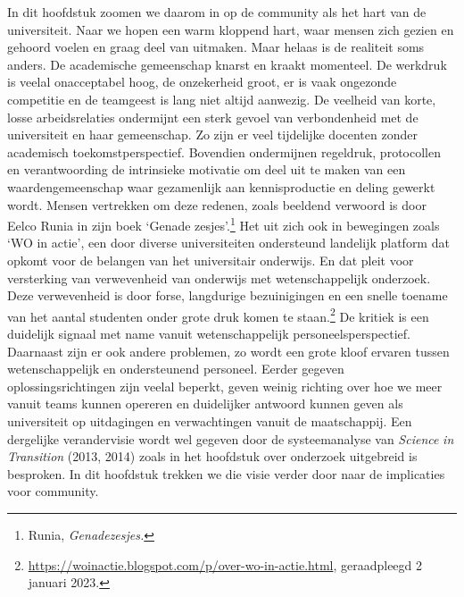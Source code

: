 \documentclass[smallauthor, chapterhaspagenum, nochapterinheader, pagenuminheader,  bigchapnum,medium2, tocpages, garamond, titleinheader]{jote-book}
\begin{document}
	In dit hoofdstuk zoomen we daarom in op de community als het hart van de universiteit. Naar we hopen een warm kloppend hart, waar mensen zich gezien en gehoord voelen en graag deel van uitmaken. Maar helaas is de realiteit soms anders. De academische gemeenschap knarst en kraakt momenteel. De werkdruk is veelal onacceptabel hoog, de onzekerheid groot, er is vaak ongezonde competitie en de teamgeest is lang niet altijd aanwezig. De veelheid van korte, losse arbeidsrelaties ondermijnt een sterk gevoel van verbondenheid met de universiteit en haar gemeenschap. Zo zijn er veel tijdelijke docenten zonder academisch toekomstperspectief. Bovendien ondermijnen regeldruk, protocollen en verantwoording de intrinsieke motivatie om deel uit te maken van een waardengemeenschap waar gezamenlijk aan kennisproductie en deling gewerkt wordt. Mensen vertrekken om deze redenen, zoals beeldend verwoord is door Eelco Runia in zijn boek ‘Genade zesjes'.\footnote{Runia, \emph{Genadezesjes}\emph{.}} Het uit zich ook in bewegingen zoals ‘WO in actie', een door diverse universiteiten ondersteund landelijk platform dat opkomt voor de belangen van het universitair onderwijs. En dat pleit voor versterking van verwevenheid van onderwijs met wetenschappelijk onderzoek. Deze verwevenheid is door forse, langdurige bezuinigingen en een snelle toename van het aantal studenten onder grote druk komen te staan.\footnote{\href{https://woinactie.blogspot.com/p/over-wo-in-actie.html}{https://woinactie.blogspot.com/p/over-wo-in-actie.html}, geraadpleegd 2 januari 2023.} De kritiek is een duidelijk signaal met name vanuit wetenschappelijk personeelsperspectief. Daarnaast zijn er ook andere problemen, zo wordt een grote kloof ervaren tussen wetenschappelijk en ondersteunend personeel. Eerder gegeven oplossingsrichtingen zijn veelal beperkt, geven weinig richting over hoe we meer vanuit teams kunnen opereren en duidelijker antwoord kunnen geven als universiteit op uitdagingen en verwachtingen vanuit de maatschappij. Een dergelijke verandervisie wordt wel gegeven door de systeemanalyse van \emph{Science}\emph{ in }\emph{Transition} (2013, 2014) zoals in het hoofdstuk over onderzoek uitgebreid is besproken. In dit hoofdstuk trekken we die visie verder door naar de implicaties voor community.
\end{document}
